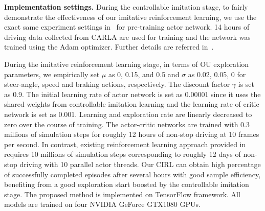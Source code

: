 \documentclass[runningheads]{llncs}
\begin{document}
\noindent\textbf{Implementation settings.} During the controllable imitation stage, to fairly demonstrate the effectiveness of our imitative reinforcement learning, we use the exact same experiment settings in~\cite{codevilla2017end} for pre-training actor network. 14 hours of driving data collected from CARLA are used for training  and the network was trained using the Adam optimizer. Further details are referred in~\cite{codevilla2017end}.

During the imitative reinforcement learning stage, in terms of OU exploration parameters, we empirically set $\mu$ as 0, 0.15, and 0.5  and $\sigma$ as 0.02, 0.05, 0 for steer-angle, speed and braking actions, respectively. The discount factor $\gamma$ is set as 0.9. The initial learning rate of actor network is set as 0.00001 since it uses the shared weights from controllable imitation learning and the learning rate of critic network is set as 0.001. Learning and exploration rate are linearly decreased to zero over the course of training. The actor-critic networks are trained with 0.3 millions of simulation steps for roughly 12 hours of non-stop driving at 10 frames per second. In contrast, existing reinforcement learning approach provided in ~\cite{dosovitskiy2017carla} requires 10 millions of simulation steps corresponding to roughly 12 days of non-stop driving with 10 parallel actor threads. Our CIRL can obtain high percentage of successfully completed episodes after several hours with good sample efficiency, benefiting from a good exploration start boosted by the controllable imitation stage. The proposed method is implemented on TensorFlow framework. All models are trained on four NVIDIA GeForce GTX1080  GPUs.
 
\end{document}
